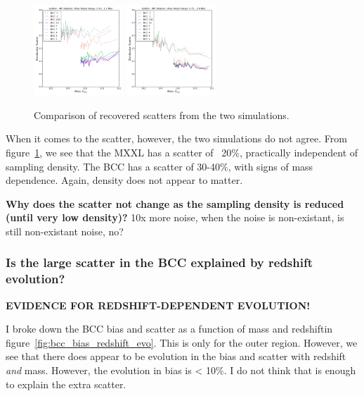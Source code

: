 \documentclass[11pt]{article}
\begin{document}
\begin{figure}
\includegraphics[width=0.3\textwidth]{figures/density_cfree-r5_scatter}
\includegraphics[width=0.3\textwidth]{figures/density_cfree-r10_scatter}
\caption{Comparison of recovered scatters from the two simulations.}
\label{fig:bcc_vs_mxxl_density_scatter}
\end{figure}

When it comes to the scatter, however, the two simulations do not agree. From figure~\ref{fig:bcc_vs_mxxl_density_scatter}, we see that the MXXL has a scatter of ~20\%, practically independent of sampling density. The BCC has a scatter of 30-40\%, with signs of mass dependence. Again, density does not appear to matter. 

\textbf{Why does the scatter not change as the sampling density is reduced (until very low density)?}
10x more noise, when the noise is non-existant, is still non-existant noise, no?

\subsubsection{Is the large scatter in the BCC explained by redshift evolution?}

\textbf{EVIDENCE FOR REDSHIFT-DEPENDENT EVOLUTION!}

I broke down the BCC bias and scatter as a function of mass and redshiftin figure~\ref{fig:bcc_bias_redshift_evo}. This is only for the outer region. However, we see that there does appear to be evolution in the bias and scatter with redshift \emph{and} mass. However, the evolution in bias is < 10\%. I do not think that is enough to explain the extra scatter.
\end{document}
